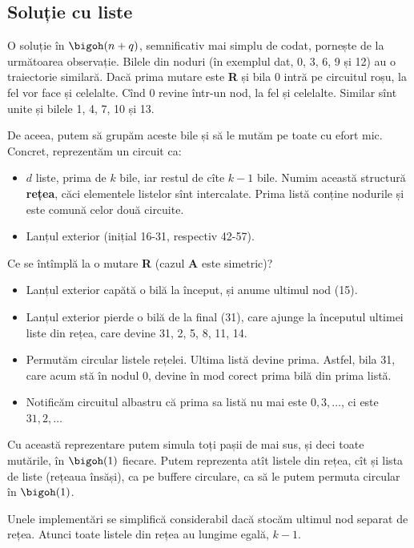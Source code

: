 \subsection{Soluție cu liste}

O soluție în $\bigoh(n + q)$, semnificativ mai simplu de codat, pornește de la următoarea observație. Bilele din noduri (în exemplul dat, 0, 3, 6, 9 și 12) au o traiectorie similară. Dacă prima mutare este \textbf{R} și bila 0 intră pe circuitul roșu, la fel vor face și celelalte. Cînd 0 revine într-un nod, la fel și celelalte. Similar sînt unite și bilele 1, 4, 7, 10 și 13.

De aceea, putem să grupăm aceste bile și să le mutăm pe toate cu efort mic. Concret, reprezentăm un circuit ca:

\begin{itemize}
  \item $d$ liste, prima de $k$ bile, iar restul de cîte $k-1$ bile. Numim această structură \textbf{rețea}, căci elementele listelor sînt intercalate. Prima listă conține nodurile și este comună celor două circuite.
  \item Lanțul exterior (inițial 16-31, respectiv 42-57).
\end{itemize}

Ce se întîmplă la o mutare \textbf{R} (cazul \textbf{A} este simetric)?

\begin{itemize}
  \item Lanțul exterior capătă o bilă la început, și anume ultimul nod (15).
  \item Lanțul exterior pierde o bilă de la final (31), care ajunge la începutul ultimei liste din rețea, care devine 31, 2, 5, 8, 11, 14.
  \item Permutăm circular listele rețelei. Ultima listă devine prima. Astfel, bila 31, care acum stă în nodul 0, devine în mod corect prima bilă din prima listă.
  \item Notificăm circuitul albastru că prima sa listă nu mai este $0, 3, \dots$, ci este $31, 2, \dots$
\end{itemize}

Cu această reprezentare putem simula toți pașii de mai sus, și deci toate mutările, în $\bigoh(1)$ fiecare. Putem reprezenta atît listele din rețea, cît și lista de liste (rețeaua însăși), ca pe buffere circulare, ca să le putem permuta circular în $\bigoh(1)$.

Unele implementări se simplifică considerabil dacă stocăm ultimul nod separat de rețea. Atunci toate listele din rețea au lungime egală, $k-1$.

